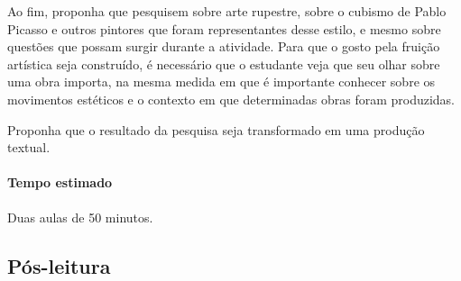 \documentclass[12pt]{extarticle}
\begin{document}
  Ao fim, proponha que pesquisem sobre arte rupestre, sobre o cubismo de
  Pablo Picasso e outros pintores que foram representantes desse estilo,
  e mesmo sobre questões que possam surgir durante a atividade. Para que
  o gosto pela fruição artística seja construído, é necessário que o
  estudante veja que seu olhar sobre uma obra importa, na mesma medida
  em que é importante conhecer sobre os movimentos estéticos e o
  contexto em que determinadas obras foram produzidas.

  Proponha que o resultado da pesquisa seja transformado em uma produção
  textual.

\paragraph{Tempo estimado} Duas aulas de 50 minutos.

\subsection{Pós-leitura}
\end{document}
